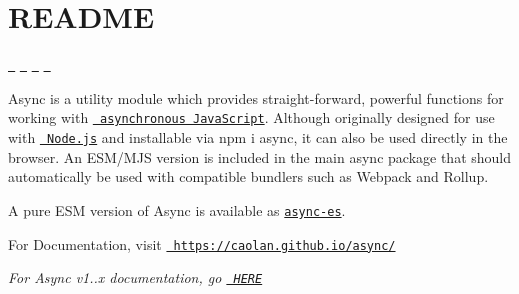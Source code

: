 \chapter{README}
\hypertarget{md__2_users_2hello_2_documents_2_git_hub_2finalproject-engine-drop-table-engines_2_engine_2src_2f5154f05deb9478b009e8795390d0780}{}\label{md__2_users_2hello_2_documents_2_git_hub_2finalproject-engine-drop-table-engines_2_engine_2src_2f5154f05deb9478b009e8795390d0780}


 \href{https://www.npmjs.com/package/async}{\texttt{ }} \href{https://coveralls.io/r/caolan/async?branch=master}{\texttt{ }} \href{https://gitter.im/caolan/async?utm_source=badge&utm_medium=badge&utm_campaign=pr-badge&utm_content=badge}{\texttt{ }} \href{https://www.jsdelivr.com/package/npm/async}{\texttt{ }}

Async is a utility module which provides straight-\/forward, powerful functions for working with \href{http://caolan.github.io/async/v3/global.html}{\texttt{ asynchronous Java\+Script}}. Although originally designed for use with \href{https://nodejs.org/}{\texttt{ Node.\+js}} and installable via {\ttfamily npm i async}, it can also be used directly in the browser. An ESM/\+MJS version is included in the main {\ttfamily async} package that should automatically be used with compatible bundlers such as Webpack and Rollup.

A pure ESM version of Async is available as \href{https://www.npmjs.com/package/async-es}{\texttt{ {\ttfamily async-\/es}}}.

For Documentation, visit \href{https://caolan.github.io/async/}{\texttt{ https\+://caolan.\+github.\+io/async/}}

{\itshape For Async v1..\+x documentation, go \href{https://github.com/caolan/async/blob/v1.5.2/README.md}{\texttt{ HERE}}}


\begin{DoxyCode}{0}
\DoxyCodeLine{}
\DoxyCodeLine{}
\DoxyCodeLine{\ \ \ \ \ \ \ \ \}}
\DoxyCodeLine{\ \ \ \ \});}
\DoxyCodeLine{\});}

\end{DoxyCode}



